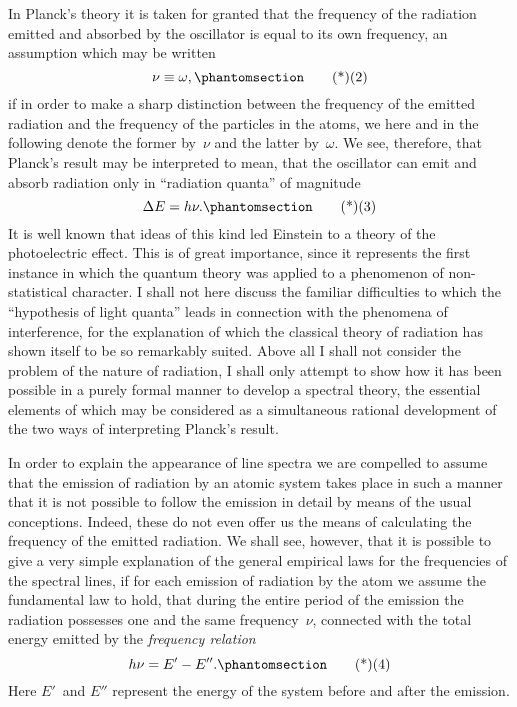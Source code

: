 In Planck's theory it is taken for granted that the frequency of
the radiation emitted and absorbed by the oscillator is equal to its
own frequency, an assumption which may be written
\[
\nu \equiv \omega,
\Tag{(2)}
\]
if in order to make a sharp distinction between the frequency of
the emitted radiation and the frequency of the particles in the atoms,
we here and in the following denote the former by~$\nu$ and the latter
by~$\omega$. We see, therefore, that Planck's result may be interpreted to
mean, that the oscillator can emit and absorb radiation only in
``radiation quanta'' of magnitude
\[
\Delta E = h\nu.
\Tag{(3)}
\]
It is well known that ideas of this kind led Einstein to a theory
of the photoelectric effect. This is of great importance, since it
represents the first instance in which the quantum theory was
applied to a phenomenon of non-statistical character. I shall not
here discuss the familiar difficulties to which the ``hypothesis of
light quanta'' leads in connection with the phenomena of interference,
for the explanation of which the classical theory of radiation
has shown itself to be so remarkably suited. Above all I shall not
consider the problem of the nature of radiation, I shall only attempt
to show how it has been possible in a purely formal manner to
develop a spectral theory, the essential elements of which may be
considered as a simultaneous rational development of the two ways
of interpreting Planck's result.



In order to explain the appearance of line spectra we are compelled
to assume that the emission of radiation by an atomic system
takes place in such a manner that it is not possible to follow the
emission in detail by means of the usual conceptions. Indeed, these
do not even offer us the means of calculating the frequency of the
emitted radiation. We shall see, however, that it is possible to give
a very simple explanation of the general empirical laws for the
frequencies of the spectral lines, if for each emission of radiation
by the atom we assume the fundamental law to hold, that during
the entire period of the emission the radiation possesses one and
the same frequency~$\nu$, connected with the total energy emitted by
the \emph{frequency relation}
\[
h\nu = E' - E''.
\Tag{(4)}
\]
Here $E'$~and $E''$ represent the energy of the system before and
after the emission.

